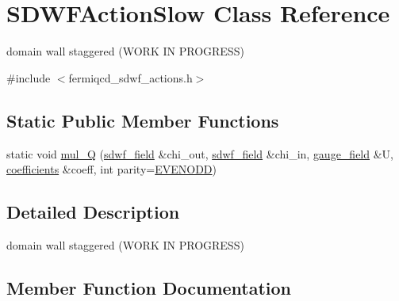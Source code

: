 \hypertarget{class_s_d_w_f_action_slow}{}\section{S\+D\+W\+F\+Action\+Slow Class Reference}
\label{class_s_d_w_f_action_slow}


domain wall staggered (W\+O\+RK IN P\+R\+O\+G\+R\+E\+SS)  




{\ttfamily \#include $<$fermiqcd\+\_\+sdwf\+\_\+actions.\+h$>$}

\subsection*{Static Public Member Functions}
\begin{DoxyCompactItemize}
\item 
static void \hyperlink{class_s_d_w_f_action_slow_a45575ccf7edbc4dbe1d326efc8d07ff8}{mul\+\_\+Q} (\hyperlink{classsdwf__field}{sdwf\+\_\+field} \&chi\+\_\+out, \hyperlink{classsdwf__field}{sdwf\+\_\+field} \&chi\+\_\+in, \hyperlink{classgauge__field}{gauge\+\_\+field} \&U, \hyperlink{classcoefficients}{coefficients} \&coeff, int parity=\hyperlink{mdp__global__vars_8h_a4c9de81f2de5a74b588107b6c0afb9ee}{E\+V\+E\+N\+O\+DD})
\end{DoxyCompactItemize}


\subsection{Detailed Description}
domain wall staggered (W\+O\+RK IN P\+R\+O\+G\+R\+E\+SS) 

\subsection{Member Function Documentation}
\mbox{\label{class_s_d_w_f_action_slow_a45575ccf7edbc4dbe1d326efc8d07ff8}} 
